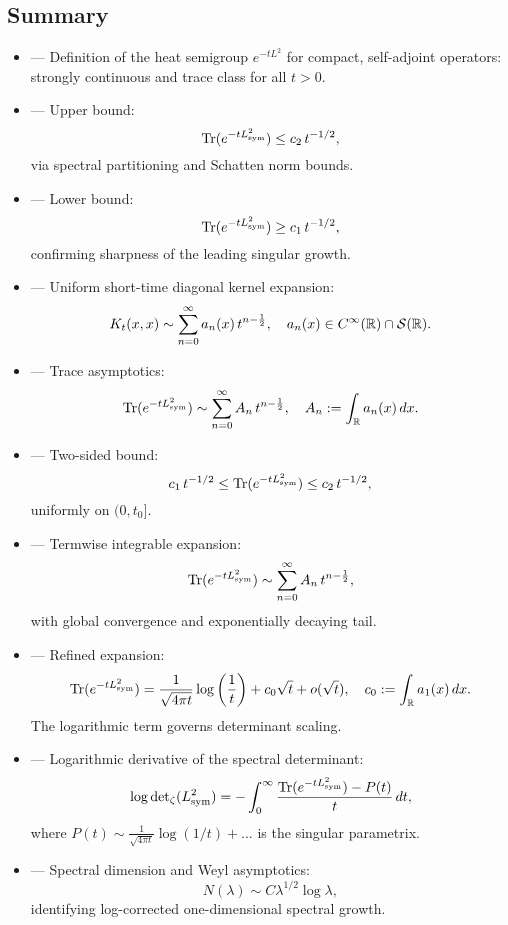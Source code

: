 \subsection*{Summary}

\begin{itemize}
  \item {} — Definition of the heat semigroup \( e^{-tL^2} \) for compact, self-adjoint operators: strongly continuous and trace class for all \( t > 0 \).

  \item {} — Upper bound:
  \[
  \operatorname{Tr}(e^{-tL_{\mathrm{sym}}^2}) \leq c_2\, t^{-1/2},
  \]
  via spectral partitioning and Schatten norm bounds.

  \item {} — Lower bound:
  \[
  \operatorname{Tr}(e^{-tL_{\mathrm{sym}}^2}) \geq c_1\, t^{-1/2},
  \]
  confirming sharpness of the leading singular growth.

  \item {} — Uniform short-time diagonal kernel expansion:
  \[
  K_t(x,x) \sim \sum_{n=0}^\infty a_n(x)\, t^{n - \frac{1}{2}}, \quad a_n(x) \in C^\infty(\mathbb{R}) \cap \mathcal{S}(\mathbb{R}).
  \]

  \item {} — Trace asymptotics:
  \[
  \operatorname{Tr}(e^{-tL_{\mathrm{sym}}^2}) \sim \sum_{n=0}^\infty A_n\, t^{n - \frac{1}{2}}, \quad
  A_n := \int_{\mathbb{R}} a_n(x)\, dx.
  \]

  \item {} — Two-sided bound:
  \[
  c_1\, t^{-1/2} \leq \operatorname{Tr}(e^{-tL_{\mathrm{sym}}^2}) \leq c_2\, t^{-1/2},
  \]
  uniformly on \( (0, t_0] \).

  \item {} — Termwise integrable expansion:
  \[
  \operatorname{Tr}(e^{-tL_{\mathrm{sym}}^2}) \sim \sum_{n=0}^\infty A_n\, t^{n - \frac{1}{2}},
  \]
  with global convergence and exponentially decaying tail.

  \item {} — Refined expansion:
  \[
  \operatorname{Tr}(e^{-tL_{\mathrm{sym}}^2})
  = \frac{1}{\sqrt{4\pi t}} \log\left( \frac{1}{t} \right)
  + c_0 \sqrt{t} + o(\sqrt{t}), \quad c_0 := \int_{\mathbb{R}} a_1(x)\, dx.
  \]
  The logarithmic term governs determinant scaling.

  \item {} — Logarithmic derivative of the spectral determinant:
  \[
  \log \det\nolimits_{\zeta}(L_{\mathrm{sym}}^2)
  = -\int_0^\infty \frac{\operatorname{Tr}(e^{-t L_{\mathrm{sym}}^2}) - P(t)}{t} \, dt,
  \]
  where \( P(t) \sim \frac{1}{\sqrt{4\pi t}} \log(1/t) + \dots \) is the singular parametrix.

  \item {} — Spectral dimension and Weyl asymptotics:
  \[
  N(\lambda) \sim C \lambda^{1/2} \log \lambda,
  \]
  identifying log-corrected one-dimensional spectral growth.
\end{itemize}

